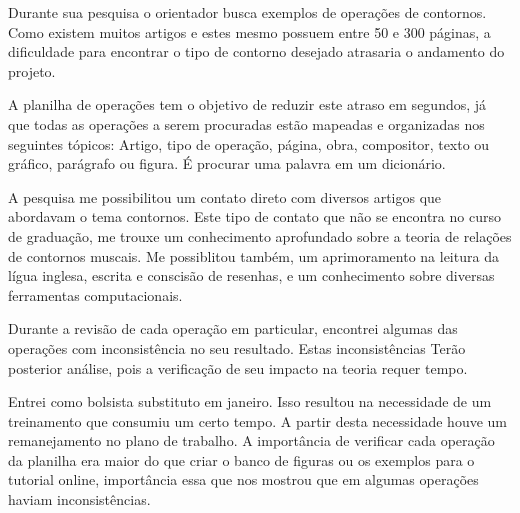 \documentclass[11pt]{article}
\begin{document}
Durante sua pesquisa o orientador busca exemplos de operações de contornos. Como existem
muitos artigos e estes mesmo possuem entre 50 e 300 páginas, a dificuldade para encontrar
o tipo de contorno desejado atrasaria o andamento do projeto.

A planilha de operações tem o objetivo de reduzir este atraso em
segundos, já que todas as operações a serem procuradas estão mapeadas
e organizadas nos seguintes tópicos: Artigo, tipo de operação, página,
obra, compositor, texto ou gráfico, parágrafo ou figura.
É procurar uma palavra em um dicionário.

A pesquisa me possibilitou um contato direto com diversos artigos que abordavam
o tema contornos. Este tipo de contato que não se encontra no curso de graduação,
me trouxe um conhecimento aprofundado sobre a teoria de relações de contornos muscais.
Me possiblitou também, um aprimoramento na leitura da lígua inglesa, escrita e conscisão
de resenhas, e um conhecimento sobre diversas ferramentas computacionais.


Durante a revisão de cada operação em particular, encontrei algumas
das operações com inconsistência no seu resultado. Estas inconsistências
Terão posterior análise, pois a verificação de seu impacto na teoria
requer tempo.

Entrei como bolsista substituto em janeiro. Isso resultou na necessidade
de um treinamento que consumiu um certo tempo. A partir desta necessidade
houve um remanejamento no plano de trabalho. A importância de verificar cada operação
da planilha era maior do que criar o banco de figuras ou os exemplos para o
tutorial online, importância essa que nos mostrou que em algumas operações
haviam inconsistências.
\end{document}
